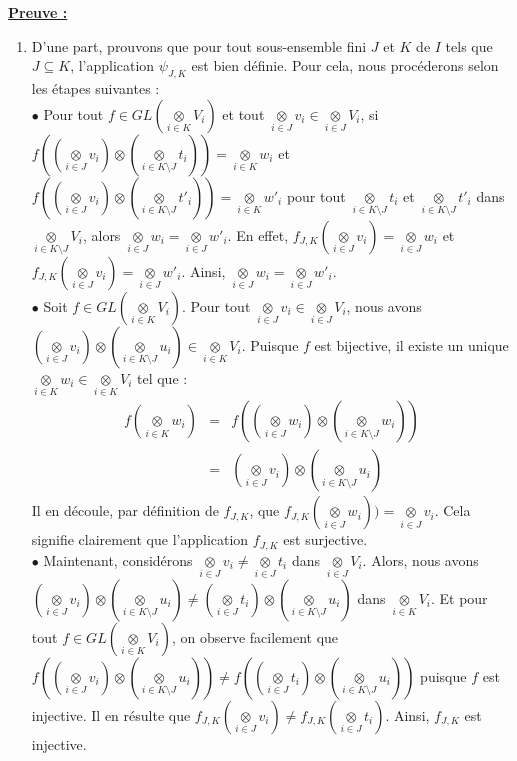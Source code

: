 \documentclass[a4paper, 14pt]{report}
\begin{document}
\begin{onehalfspace}
{			
			\textbf{\underline{Preuve :}}
			\begin{enumerate}
				\item D'une part, prouvons que pour tout sous-ensemble fini $J$ et $K$ de $I$ tels que $J\subseteq K$, l'application $\psi_{J,K}$ est bien définie. Pour cela, nous procéderons selon les étapes suivantes :\\
				$\bullet$ Pour tout $f\in GL(\underset{i\in K}\otimes V_i)$ et tout $\underset{i\in J}\otimes v_i\in \underset{i\in J}\otimes V_i$, si $f((\underset{i\in J}\otimes v_i)\otimes (\underset{i\in K\setminus J}\otimes t_i))= \underset{i\in K}\otimes w_i$ et $f((\underset{i\in J}\otimes v_i)\otimes (\underset{i\in K\setminus J}\otimes t'_i))= \underset{i\in K}\otimes w'_i$ pour tout $\underset{i\in K\setminus J}\otimes t_i$ et $\underset{i\in K\setminus J}\otimes t'_i$ dans $\underset{i\in K\setminus J}\otimes V_i$, alors $\underset{i\in J}\otimes w_i= \underset{i\in J}\otimes w'_i$. En effet, $f_{J,K}(\underset{i\in J}\otimes v_i)= \underset{i\in J}\otimes w_i$ et $f_{J,K}(\underset{i\in J}\otimes v_i)= \underset{i\in J}\otimes w'_i$. Ainsi, $\underset{i\in J}\otimes w_i= \underset{i\in J}\otimes w'_i$.\\
				$\bullet$ Soit $f\in GL(\underset{i\in K}\otimes V_i)$. Pour tout $\underset{i\in J}\otimes v_i\in \underset{i\in J}\otimes V_i$, nous avons $(\underset{i\in J}\otimes v_i)\otimes (\underset{i\in K\setminus J}\otimes u_i)\in \underset{i\in K}\otimes V_i$. Puisque $f$ est bijective, il existe un unique $\underset{i\in K}\otimes w_i\in \underset{i\in K}\otimes V_i$ tel que :
				$$\begin{array}{rlll}
					f(\underset{i\in K}\otimes w_i)&=& f((\underset{i\in J}\otimes w_i)\otimes (\underset{i\in K\setminus J}\otimes w_i))\\
					&=& (\underset{i\in J}\otimes v_i)\otimes (\underset{i\in K\setminus J}\otimes u_i)
				\end{array}$$
				Il en découle, par définition de $f_{J,K}$, que $f_{J,K}(\underset{i\in J}\otimes w_i))= \underset{i\in J}\otimes v_i$. Cela signifie clairement que l'application $f_{J,K}$ est surjective.\\
				$\bullet$ Maintenant, considérons $\underset{i\in J}\otimes v_i\neq \underset{i\in J}\otimes t_i$ dans $\underset{i\in J}\otimes V_i$. Alors, nous avons $(\underset{i\in J}\otimes v_i)\otimes (\underset{i\in K\setminus J}\otimes u_i)\neq (\underset{i\in J}\otimes t_i)\otimes (\underset{i\in K\setminus J}\otimes u_i)$ dans $\underset{i\in K}\otimes V_i$. Et pour tout $f\in GL(\underset{i\in K}\otimes V_i)$, on observe facilement que $f((\underset{i\in J}\otimes v_i)\otimes (\underset{i\in K\setminus J}\otimes u_i))\neq f((\underset{i\in J}\otimes t_i)\otimes (\underset{i\in K\setminus J}\otimes u_i))$ puisque $f$ est injective. Il en résulte que $f_{J,K}(\underset{i\in J}\otimes v_i)\neq f_{J,K}(\underset{i\in J}\otimes t_i)$. Ainsi, $f_{J,K}$ est injective.\\
				

\end{enumerate}}
\end{onehalfspace}
\end{document}
